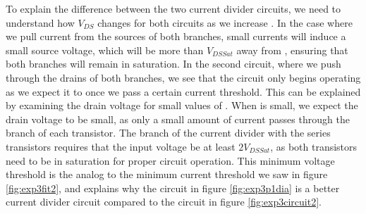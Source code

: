 To explain the difference between the two current divider circuits, we need to understand how $V_{DS}$ changes for both circuits as we increase \Iin. In the case where we pull current from the sources of both branches, small currents will induce a small source voltage, which will be more than $V_{DSSat}$ away from \Vdd, ensuring that both branches will remain in saturation. In the second circuit, where we push \Iin through the drains of both branches, we see that the circuit only begins operating as we expect it to once we pass a certain current threshold. This can be explained by examining the drain voltage for small values of \Iin. When \Iin is small, we expect the drain voltage to be small, as only a small amount of current passes through the branch of each transistor. The branch of the current divider with the series transistors requires that the input voltage be at least $2V_{DSSat}$, as both transistors need to be in saturation for proper circuit operation. This minimum voltage threshold is the analog to the minimum current threshold we saw in figure \ref{fig:exp3fit2}, and explains why the circuit in figure \ref{fig:exp3p1dia} is a better current divider circuit compared to the circuit in figure \ref{fig:exp3circuit2}.